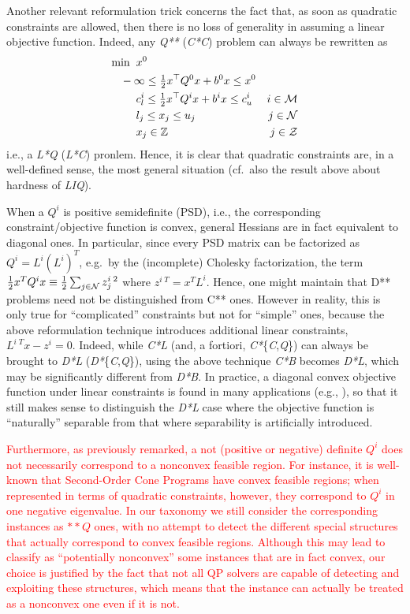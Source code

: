 Another relevant reformulation trick concerns the fact that, as soon as quadratic constraints are allowed, then there is no loss of generality in assuming a linear objective function. Indeed, any \textit{Q**} (\textit{C*C}) problem can always be rewritten as
%
\begin{align*}
 \min \;\;
 & x^0 \\
 & \hspace*{-5mm} -\infty \leq {\textstyle \half} x^\top Q^0 x + b^0 x \leq x^0 & \\
 & c^i_l \leq {\textstyle \half} x^\top Q^i x + b^i x \leq c^i_u & i \in \Mcm \\
 & l_j \leq x_j \leq u_j & j \in \Mcn  \\
 & x_j \in \mathbb{Z} & j \in \Mcz
\end{align*}
%
i.e., a \textit{L*Q} (\textit{L*C}) pronlem. Hence, it is clear that quadratic constraints are, in a well-defined sense, the most general situation (cf.~also the result above about hardness of \textit{LIQ}).

When a $Q^i$ is positive semidefinite (PSD), i.e., the corresponding constraint/objective function is convex, general Hessians are in fact equivalent to diagonal ones. In particular, since every PSD matrix can be factorized as $Q^i = L^i (L^i)^T$, e.g.~by the (incomplete) Cholesky factorization, the term $\frac{1}{2} x^T Q^i x \equiv \frac{1}{2} \sum_{j \in \mathcal{N}} z^{i\;2}_j$ where $z^{i\;T} = x^T L^i$. Hence, one might maintain that D** problems need not be distinguished from C** ones. However in reality, this is only true for ``complicated'' constraints but not for ``simple'' ones, because the above reformulation technique introduces additional linear constraints, $L^{i\;T} x - z^i = 0$. Indeed, while \textit{C*L} (and, a fortiori, \textit{C*}\{\textit{C},\textit{Q}\}) can always be brought to \textit{D*L} (\textit{D*}\{\textit{C},\textit{Q}\}), using the above technique \textit{C*B} becomes \textit{D*L}, which may be significantly different from \textit{D*B}. In practice, a diagonal convex objective function under linear constraints is found in many applications (e.g., \cite{FrFG16,FrGe06a,FrGe09a,FGGP11}), so that it still makes sense to distinguish the \textit{D*L} case where the objective function is ``naturally'' separable from that where separability is artificially introduced.

\textcolor{red}{
Furthermore, as previously remarked, a not (positive or negative) definite $Q^i$ does not necessarily correspond to a nonconvex feasible region. For instance, it is well-known that Second-Order Cone Programs have convex feasible regions; when represented in terms of quadratic constraints, however, they correspond to $Q^i$ in one negative eigenvalue. In our taxonomy we still consider the corresponding instances as $**Q$ ones, with no attempt to detect the different special structures that actually correspond to convex feasible regions. Although this may lead to classify as ``potentially nonconvex'' some instances that are in fact convex, our choice is justified by the fact that not all QP solvers are capable of detecting and exploiting these structures, which means that the instance can actually be treated as a nonconvex one even if it is not.
}

